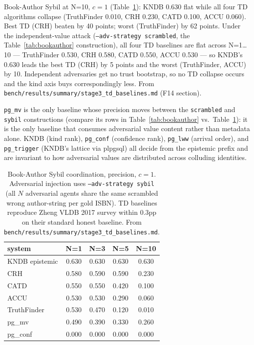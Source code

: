 \documentclass[sigconf, nonacm]{acmart}
\begin{document}
Book-Author Sybil at N=10, $c=1$ (Table~\ref{tab:td-sybil}): KNDB 0.630 flat while all four TD algorithms collapse (TruthFinder 0.010, CRH 0.230, CATD 0.100, ACCU 0.060). Best TD (CRH) beaten by 40 points; worst (TruthFinder) by 62 points. Under the independent-value attack (\texttt{--adv-strategy scrambled}, the Table~\ref{tab:bookauthor} construction), all four TD baselines are flat across N=1\ldots 10 --- TruthFinder 0.530, CRH 0.580, CATD 0.550, ACCU 0.530 --- so KNDB's 0.630 leads the best TD (CRH) by 5 points and the worst (TruthFinder, ACCU) by 10. Independent adversaries get no trust bootstrap, so no TD collapse occurs and the kind axis buys correspondingly less. From \texttt{bench/results/summary/stage3\_td\_baselines.md} (F14 section).

\texttt{pg\_mv} is the only baseline whose precision moves between the \texttt{scrambled} and \texttt{sybil} constructions (compare its rows in Table~\ref{tab:bookauthor} vs.\ Table~\ref{tab:td-sybil}): it is the only baseline that consumes adversarial value content rather than metadata alone. KNDB (kind rank), \texttt{pg\_conf} (confidence rank), \texttt{pg\_lww} (arrival order), and \texttt{pg\_trigger} (KNDB's lattice via plpgsql) all decide from the epistemic prefix and are invariant to how adversarial values are distributed across colluding identities.

\begin{table}[t]
\centering
\caption{Book-Author Sybil coordination, precision, $c=1$. Adversarial injection uses \texttt{--adv-strategy sybil} (all $N$ adversarial agents share the same scrambled wrong author-string per gold ISBN). TD baselines reproduce Zheng VLDB 2017 survey within 0.3pp on their standard honest baseline. From \texttt{bench/results/summary/stage3\_td\_baselines.md}.}
\label{tab:td-sybil}
\small
\begin{tabular}{lcccc}
\toprule
system & N=1 & N=3 & N=5 & N=10 \\
\midrule
KNDB epistemic & 0.630 & 0.630 & 0.630 & 0.630 \\
CRH            & 0.580 & 0.590 & 0.590 & 0.230 \\
CATD           & 0.550 & 0.550 & 0.420 & 0.100 \\
ACCU           & 0.530 & 0.530 & 0.290 & 0.060 \\
TruthFinder    & 0.530 & 0.470 & 0.120 & 0.010 \\
pg\_mv         & 0.490 & 0.390 & 0.330 & 0.260 \\
pg\_conf       & 0.000 & 0.000 & 0.000 & 0.000 \\
\bottomrule
\end{tabular}
\end{table}
\end{document}
